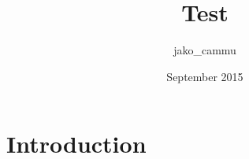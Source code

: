 \documentclass{article}
\title{Test}
\author{jako_cammu }
\date{September 2015}
\begin{document}
\maketitle

\section{Introduction}
\end{document}
